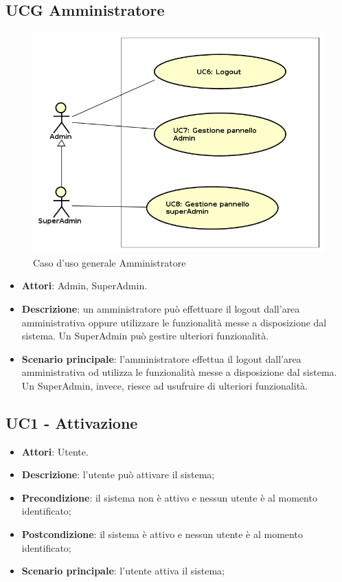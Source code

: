 \documentclass[../AnalisiDeiRequisiti_v4.0.0.tex]{subfiles}
\begin{document}
\subsection{UCG Amministratore} 
\label{sssec:UCG_Admin} 
\begin{figure}[!h]
	\centering
	\includegraphics[width=\textwidth]{UseCases/UCG_Amministratore/UCG_Amministratore.png}
	\caption{Caso d'uso generale Amministratore}
\end{figure}
\begin{itemize} 
\item \textbf{Attori}: Admin, SuperAdmin.
\item \textbf{Descrizione}: un amministratore può effettuare il logout dall'area amministrativa oppure utilizzare le funzionalità messe a disposizione dal sistema. Un SuperAdmin può gestire ulteriori funzionalità.
\item \textbf{Scenario principale}: l'amministratore effettua il logout dall'area amministrativa od utilizza le funzionalità messe a disposizione dal sistema. Un SuperAdmin, invece, riesce ad usufruire di ulteriori funzionalità.
\end{itemize}
\newpage
\subsection{UC1 - Attivazione} 
\label{sssec:UC1}
\begin{itemize} 
\item \textbf{Attori}: Utente.
\item \textbf{Descrizione}: l'utente può attivare il sistema;
\item \textbf{Precondizione}: il sistema non è attivo e nessun utente è al momento identificato;
\item \textbf{Postcondizione}: il sistema è attivo e nessun utente è al momento identificato;
\item \textbf{Scenario principale}: l'utente attiva il sistema;
\end{itemize} 
\end{document}
